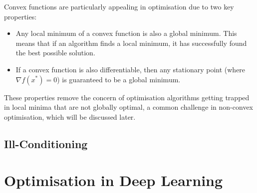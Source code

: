 Convex functions are particularly appealing in optimisation due to two key properties:
\begin{itemize}
    \item Any local minimum of a convex function is also a global minimum. This means that if an algorithm finds a local minimum, it has successfully found the best possible solution.
    \item If a convex function is also differentiable, then any stationary point (where $\nabla f(x^*) = 0$) is guaranteed to be a global minimum.
\end{itemize}
These properties remove the concern of optimisation algorithms getting trapped in local minima that are not globally optimal, a common challenge in non-convex optimisation, which will be discussed later.

\subsection{Ill-Conditioning}


\section{Optimisation in Deep Learning}
\label{sec:optimisation_in_deep_learning}





